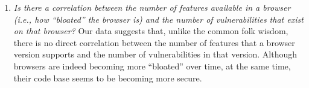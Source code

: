 \begin{enumerate}
\item {\em Is there a correlation between the number of features
    available in a browser (i.e., how ``bloated'' the browser is) and
    the number of vulnerabilities that exist on that browser?} Our
  data suggests that, unlike the common folk wisdom, there is no
  direct correlation between the number of features that a browser
  version supports and the number of vulnerabilities in that
  version. Although browsers are indeed becoming more ``bloated'' over
  time, at the same time, their code base seems to be becoming more
  secure.
    
\end{enumerate}

